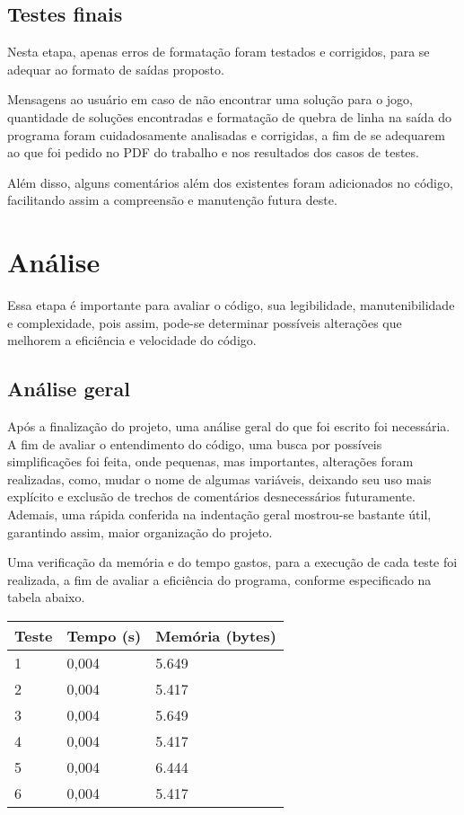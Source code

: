 \documentclass{article}
\begin{document}
\subsection{Testes finais}

Nesta etapa, apenas erros de formatação foram testados e corrigidos, para se adequar ao formato de saídas proposto.

Mensagens ao usuário em caso de não encontrar uma solução para o jogo, quantidade de soluções encontradas e formatação de quebra de linha na saída do programa foram cuidadosamente analisadas e corrigidas, a fim de se adequarem ao que foi pedido no PDF do trabalho e nos resultados dos casos de testes.

Além disso, alguns comentários além dos existentes foram adicionados no código, facilitando assim a compreensão e manutenção futura deste.


\section{Análise}
Essa etapa é importante para avaliar o código, sua legibilidade, manutenibilidade e complexidade, pois assim, pode-se determinar possíveis alterações que melhorem a eficiência e velocidade do código.

\subsection{Análise geral}
 Após a finalização do projeto, uma análise geral do que foi escrito foi necessária. A fim de avaliar o entendimento do código, uma busca por possíveis simplificações foi feita, onde pequenas, mas importantes, alterações foram realizadas, como, mudar o nome de algumas variáveis, deixando seu uso mais explícito e exclusão de trechos de comentários desnecessários futuramente. Ademais, uma rápida conferida na indentação geral mostrou-se bastante útil, garantindo assim, maior organização do projeto.

 Uma verificação da memória e do tempo gastos, para a execução de cada teste foi realizada, a fim de avaliar a eficiência do programa, conforme especificado na tabela abaixo.

\begin{table}[!htb]
    \centering
    \begin{tabular}{l | l | l}
    \hline
    Teste & Tempo (s) & Memória (bytes) \\ \hline
    1     & 0,004     & 5.649           \\ \hline
    2     & 0,004     & 5.417           \\ \hline
    3     & 0,004     & 5.649           \\ \hline
    4     & 0,004     & 5.417           \\ \hline
    5     & 0,004     & 6.444           \\ \hline
    6     & 0,004     & 5.417           \\ \hline
    \end{tabular}
    \label{tab:tempo_memoria}
\end{table}
\end{document}
